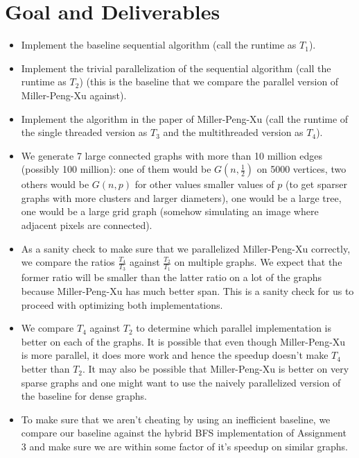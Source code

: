 \documentclass[11pt]{scrartcl}
\theoremstyle{plain}
\theoremstyle{definition}
\theoremstyle{remark}
\begin{document}
\section{Goal and Deliverables}
\begin{itemize}
\item Implement the baseline sequential algorithm (call the runtime as $T_1$).

\item Implement the trivial parallelization of the sequential algorithm (call the runtime
as $T_2$) (this is the baseline that we compare the parallel version of Miller-Peng-Xu
against).

\item Implement the algorithm in the paper of Miller-Peng-Xu (call the runtime of the
single threaded version as $T_3$ and the multithreaded version as $T_4$).

\item We generate 7 large connected graphs with more than 10 million edges (possibly 100 million):
one of them would be $G(n,\frac{1}{2})$ on 5000 vertices, two others would be
$G(n,p)$ for other values smaller values of $p$ (to get sparser graphs with more
clusters and larger diameters), one would be a large tree, one would be a large grid graph
(somehow simulating an image where adjacent pixels are connected).

\item As a sanity check to make sure that we parallelized Miller-Peng-Xu correctly, we
compare the ratios $\frac{T_4}{T_3}$ against $\frac{T_2}{T_1}$ on multiple graphs.
We expect that the former ratio will be smaller than the latter ratio on a lot of the graphs because
Miller-Peng-Xu has much better span. This is a sanity check for us to proceed with optimizing both
implementations.

\item We compare $T_4$ against $T_2$ to determine which parallel implementation is better
on each of the graphs. It is possible that even though Miller-Peng-Xu is more parallel, it does more work and
hence the speedup doesn't make $T_4$ better than $T_2$. It may also be possible that Miller-Peng-Xu
is better on very sparse graphs and one might want to use the naively parallelized
version of the baseline for dense graphs.

\item To make sure that we aren't cheating by using an inefficient baseline, we compare our baseline
against the hybrid BFS implementation of Assignment 3 and make sure we are within some factor
of it's speedup on similar graphs.


\end{itemize}
\end{document}
